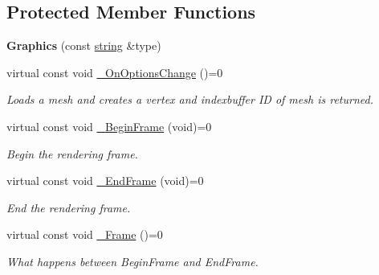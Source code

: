 \subsection*{Protected Member Functions}
\begin{DoxyCompactItemize}
\item 
{\bfseries Graphics} (const \hyperlink{class_ensum_1_1string}{string} \&type)\hypertarget{class_ensum_1_1_graphics_1_1_graphics_ad8b5c80d5999b74320aa9bf13dead117}{}\label{class_ensum_1_1_graphics_1_1_graphics_ad8b5c80d5999b74320aa9bf13dead117}

\item 
virtual const void \hyperlink{class_ensum_1_1_graphics_1_1_graphics_a530a469dbfc96e4224c916f2253b8764}{\+\_\+\+On\+Options\+Change} ()=0
\begin{DoxyCompactList}\small\item\em Loads a mesh and creates a vertex and indexbuffer ID of mesh is returned. \end{DoxyCompactList}\item 
virtual const void \hyperlink{class_ensum_1_1_graphics_1_1_graphics_a79847436ca7588f8e3af99342461206c}{\+\_\+\+Begin\+Frame} (void)=0\hypertarget{class_ensum_1_1_graphics_1_1_graphics_a79847436ca7588f8e3af99342461206c}{}\label{class_ensum_1_1_graphics_1_1_graphics_a79847436ca7588f8e3af99342461206c}

\begin{DoxyCompactList}\small\item\em Begin the rendering frame. \end{DoxyCompactList}\item 
virtual const void \hyperlink{class_ensum_1_1_graphics_1_1_graphics_a0bdc9c86d0b314d6243e25c22eaecff9}{\+\_\+\+End\+Frame} (void)=0\hypertarget{class_ensum_1_1_graphics_1_1_graphics_a0bdc9c86d0b314d6243e25c22eaecff9}{}\label{class_ensum_1_1_graphics_1_1_graphics_a0bdc9c86d0b314d6243e25c22eaecff9}

\begin{DoxyCompactList}\small\item\em End the rendering frame. \end{DoxyCompactList}\item 
virtual const void \hyperlink{class_ensum_1_1_graphics_1_1_graphics_a0bf982fe118c7cbb23ad900509222e35}{\+\_\+\+Frame} ()=0\hypertarget{class_ensum_1_1_graphics_1_1_graphics_a0bf982fe118c7cbb23ad900509222e35}{}\label{class_ensum_1_1_graphics_1_1_graphics_a0bf982fe118c7cbb23ad900509222e35}

\begin{DoxyCompactList}\small\item\em What happens between Begin\+Frame and End\+Frame. \end{DoxyCompactList}\end{DoxyCompactItemize}
